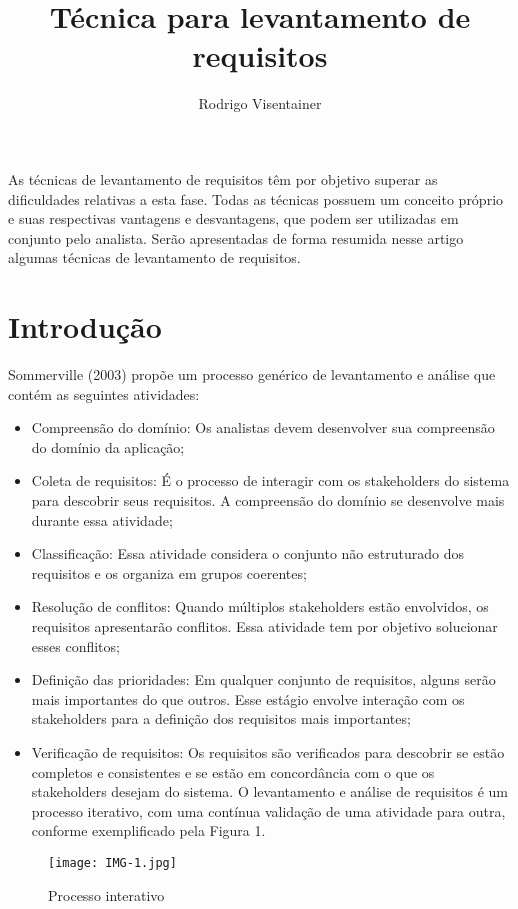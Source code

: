\documentclass[12pt]{article}
\title{Técnica para levantamento de requisitos}
\author{Rodrigo Visentainer}
\begin{document}
 
\maketitle
\begin{resumo} 
  As técnicas de levantamento de requisitos têm por objetivo superar as dificuldades relativas a esta fase. Todas as técnicas possuem um conceito próprio e suas respectivas vantagens e desvantagens, que podem ser utilizadas em conjunto pelo analista. Serão apresentadas de forma resumida nesse artigo algumas técnicas de levantamento de requisitos.
\end{resumo}
\section{Introdução}
Sommerville (2003) propõe um processo genérico de levantamento e análise que contém as seguintes atividades:
\begin{itemize}
\item Compreensão do domínio: Os analistas devem desenvolver sua compreensão do domínio da aplicação;
\item Coleta de requisitos: É o processo de interagir com os stakeholders do sistema para descobrir seus requisitos. A compreensão do domínio se desenvolve mais durante essa atividade;
\item Classificação: Essa atividade considera o conjunto não estruturado dos requisitos e os organiza em grupos coerentes;
\item Resolução de conflitos: Quando múltiplos stakeholders estão envolvidos, os requisitos apresentarão conflitos. Essa atividade tem por objetivo solucionar esses conflitos;
\item Definição das prioridades: Em qualquer conjunto de requisitos, alguns serão mais importantes do que outros. Esse estágio envolve interação com os stakeholders para a definição dos requisitos mais importantes;
\item Verificação de requisitos: Os requisitos são verificados para descobrir se estão completos e consistentes e se estão em concordância com o que os stakeholders desejam do sistema.
O levantamento e análise de requisitos é um processo iterativo, com uma contínua validação de uma atividade para outra, conforme exemplificado pela Figura 1.
\end{itemize}

\begin{figure}[ht]
\centering
\texttt{[image: IMG-1.jpg]}
\caption{Processo interativo}
\label{fig:scrumboard}
\end{figure}
\end{document}
